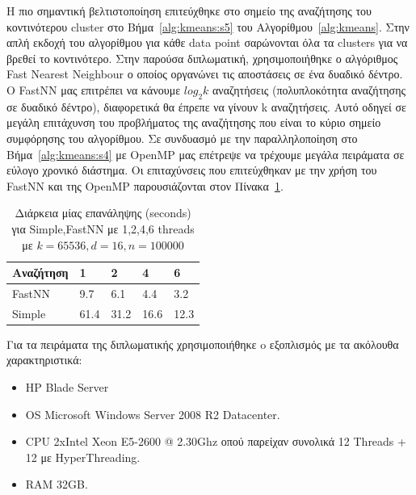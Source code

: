 \indent Η πιο σημαντική βελτιστοποίηση επιτεύχθηκε στο σημείο της αναζήτησης του κοντινότερου cluster στο 
Βήμα~\ref{alg:kmeans:s5} του Αλγορίθμου~\ref{alg:kmeans}. Στην απλή εκδοχή του αλγορίθμου για κάθε data point 
σαρώνονται όλα τα clusters για να βρεθεί το κοντινότερο. Στην παρούσα διπλωματική, χρησιμοποιήθηκε ο αλγόριθμος 
Fast Nearest Neighbour ο οποίος οργανώνει τις αποστάσεις σε ένα δυαδικό δέντρο. Ο FastNN μας επιτρέπει να κάνουμε 
$ log_{2} k $  αναζητήσεις (πολυπλοκότητα αναζήτησης σε δυαδικό δέντρο), διαφορετικά θα έπρεπε να γίνουν k αναζητήσεις. 
Αυτό οδηγεί σε μεγάλη επιτάχυνση του προβλήματος της αναζήτησης που είναι το κύριο σημείο συμφόρησης του αλγορίθμου. Σε 
συνδυασμό με την παραλληλοποίηση στο Βήμα~\ref{alg:kmeans:s4} με OpenMP μας επέτρεψε να τρέχουμε μεγάλα πειράματα σε 
εύλογο χρονικό διάστημα. Οι επιταχύνσεις που επιτεύχθηκαν με την χρήση του FastNN και της OpenMP παρουσιάζονται 
στον Πίνακα~\ref{table:fastnn}.

\begin{table}[h!]
    \begin{center}
        \begin{tabular}{| l | l | l | l | l |}
        \hline
        Αναζήτηση   & 1     & 2      & 4     & 6    \\ \hline
        FastNN  & 9.7   & 6.1    & 4.4   & 3.2  \\ \hline
        Simple  & 61.4  & 31.2   & 16.6  & 12.3    \\ \hline
        \hline
        \end{tabular}
    \end{center}
    \caption{Διάρκεια μίας επανάληψης (seconds) για Simple,FastNN με 1,2,4,6 threads με $k=65536,d=16,n=100000$}
    \label{table:fastnn}
\end{table}

\newpage

\indent Για τα πειράματα της διπλωματικής χρησιμοποιήθηκε o εξοπλισμός με τα ακόλουθα χαρακτηριστικά:
\begin{itemize}
    \item HP Blade Server
    \item OS Microsoft Windows Server 2008 R2 Datacenter.
    \item CPU 2xIntel Xeon E5-2600 @ 2.30Ghz οπού παρείχαν συνολικά 12 Threads + 12 με HyperThreading.
    \item RAM 32GB.
\end{itemize} 